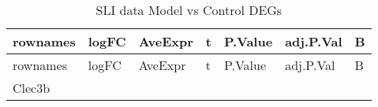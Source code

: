 \documentclass[
]{article}
\begin{document}
\begin{longtable}[]{@{}lllllll@{}}
\caption{\label{tab:SLI-data-Model-vs-Control-DEGs}SLI data Model vs Control DEGs}\tabularnewline
\toprule
\begin{minipage}[b]{0.08\columnwidth}\raggedright
rownames\strut
\end{minipage} & \begin{minipage}[b]{0.12\columnwidth}\raggedright
logFC\strut
\end{minipage} & \begin{minipage}[b]{0.12\columnwidth}\raggedright
AveExpr\strut
\end{minipage} & \begin{minipage}[b]{0.12\columnwidth}\raggedright
t\strut
\end{minipage} & \begin{minipage}[b]{0.12\columnwidth}\raggedright
P.Value\strut
\end{minipage} & \begin{minipage}[b]{0.12\columnwidth}\raggedright
adj.P.Val\strut
\end{minipage} & \begin{minipage}[b]{0.12\columnwidth}\raggedright
B\strut
\end{minipage}\tabularnewline
\midrule
\endfirsthead
\toprule
\begin{minipage}[b]{0.08\columnwidth}\raggedright
rownames\strut
\end{minipage} & \begin{minipage}[b]{0.12\columnwidth}\raggedright
logFC\strut
\end{minipage} & \begin{minipage}[b]{0.12\columnwidth}\raggedright
AveExpr\strut
\end{minipage} & \begin{minipage}[b]{0.12\columnwidth}\raggedright
t\strut
\end{minipage} & \begin{minipage}[b]{0.12\columnwidth}\raggedright
P.Value\strut
\end{minipage} & \begin{minipage}[b]{0.12\columnwidth}\raggedright
adj.P.Val\strut
\end{minipage} & \begin{minipage}[b]{0.12\columnwidth}\raggedright
B\strut
\end{minipage}\tabularnewline
\midrule
\endhead
\begin{minipage}[t]{0.08\columnwidth}\raggedright
Clec3b\strut
\end{minipage} & \begin{minipage}[t]{0.12\columnwidth}\raggedright

\end{minipage}
\end{longtable}
\end{document}
